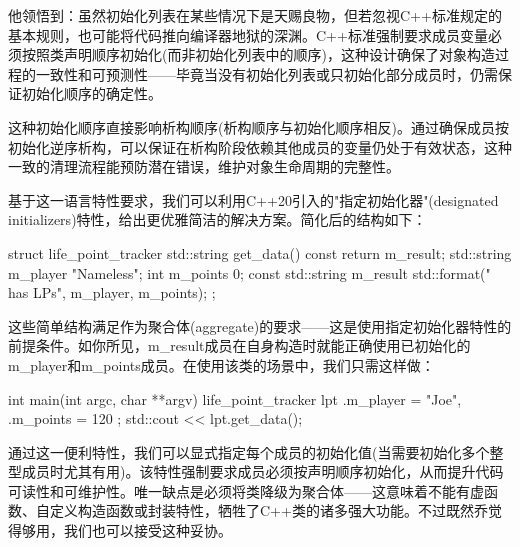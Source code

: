他领悟到：虽然初始化列表在某些情况下是天赐良物，但若忽视C++标准规定的基本规则，也可能将代码推向编译器地狱的深渊。C++标准强制要求成员变量必须按照类声明顺序初始化(而非初始化列表中的顺序)，这种设计确保了对象构造过程的一致性和可预测性——毕竟当没有初始化列表或只初始化部分成员时，仍需保证初始化顺序的确定性。

这种初始化顺序直接影响析构顺序(析构顺序与初始化顺序相反)。通过确保成员按初始化逆序析构，可以保证在析构阶段依赖其他成员的变量仍处于有效状态，这种一致的清理流程能预防潜在错误，维护对象生命周期的完整性。

基于这一语言特性要求，我们可以利用C++20引入的"指定初始化器"(designated initializers)特性，给出更优雅简洁的解决方案。简化后的结构如下：

\begin{cpp}
struct life_point_tracker {
  std::string get_data() const {
  return m_result;
  }
  std::string m_player {"Nameless"};
  int m_points {0};
  const std::string m_result
    {std::format("{} has {} LPs", m_player, m_points)};
};
\end{cpp}

这些简单结构满足作为聚合体(aggregate)的要求——这是使用指定初始化器特性的前提条件。如你所见，m\_result成员在自身构造时就能正确使用已初始化的m\_player和m\_points成员。在使用该类的场景中，我们只需这样做：

\begin{cpp}
int main(int argc, char **argv) {
  life_point_tracker lpt {
    .m_player = "Joe",
    .m_points = 120
  };
  std::cout << lpt.get_data();
}
\end{cpp}

通过这一便利特性，我们可以显式指定每个成员的初始化值(当需要初始化多个整型成员时尤其有用)。该特性强制要求成员必须按声明顺序初始化，从而提升代码可读性和可维护性。唯一缺点是必须将类降级为聚合体——这意味着不能有虚函数、自定义构造函数或封装特性，牺牲了C++类的诸多强大功能。不过既然乔觉得够用，我们也可以接受这种妥协。



